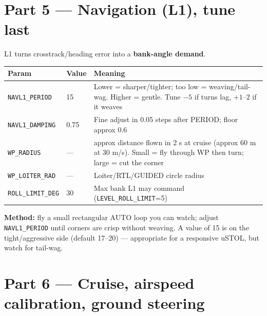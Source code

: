 \documentclass[11pt,a4paper]{article}
\newcommand{\pp}[1]{\texttt{#1}} %
\begin{document}
\section{Part 5 --- Navigation (L1), tune last}

L1 turns crosstrack/heading error into a \textbf{bank-angle demand}.

\begin{longtable}{@{}p{3.0cm}p{1.8cm}p{10.0cm}@{}}
\toprule
\textbf{Param} & \textbf{Value} & \textbf{Meaning}\\
\midrule
\endhead
\pp{NAVL1\_PERIOD} & 15 & Lower = sharper/tighter; too low = weaving/tail-wag. Higher = gentle. Tune $-5$ if turns lag, $+1$--$2$ if it weaves\\
\pp{NAVL1\_DAMPING} & 0.75 & Fine adjust in 0.05 steps after PERIOD; floor approx 0.6\\
\pp{WP\_RADIUS} & --- & approx distance flown in 2 s at cruise (approx 60 m at 30 m/s). Small = fly through WP then turn; large = cut the corner\\
\pp{WP\_LOITER\_RAD} & --- & Loiter/RTL/GUIDED circle radius\\
\pp{ROLL\_LIMIT\_DEG} & 30 & Max bank L1 may command (\pp{LEVEL\_ROLL\_LIMIT}=5)\\
\bottomrule
\end{longtable}

\textbf{Method:} fly a small rectangular AUTO loop you can watch; adjust
\pp{NAVL1\_PERIOD} until corners are crisp without weaving. A value of 15 is on
the tight/aggressive side (default 17--20) --- appropriate for a responsive
uSTOL, but watch for tail-wag.

\section{Part 6 --- Cruise, airspeed calibration, ground steering}
\end{document}
